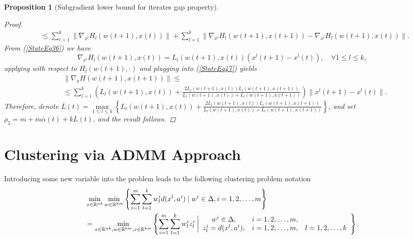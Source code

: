 \documentclass[11pt]{article}
\numberwithin{equation}{section}
\newtheorem{proposition}{Proposition}[section]
\begin{document}
\begin{proposition}[Subgradient lower bound for iterates gap property]
\begin{proof}
\begin{equation}
\begin{aligned}
	&\leq \sum\limits_{l=1}^{k} \| \nabla_{x^l} H_l(w(t+1),x(t)) \| + \sum\limits_{l=1}^{k} \| \nabla_{x^l} H_l(w(t+1),x(t+1)) - \nabla_{x^l} H_l(w(t+1),x(t))\| . \label{StateEq47}
\end{aligned}
\end{equation}
From (\ref{StateEq36}) we have
\begin{equation*}
\nabla_{x^l} H_l(w(t+1),x(t)) = L_l(w(t+1),x(t)) \left( x^l(t+1) - x^l(t) \right) , \quad \forall 1 \leq l \leq k,
\end{equation*}
applying  with respect to $H_l(w(t+1),\cdot)$ and plugging into (\ref{StateEq47}) yields
\begin{equation*}
\begin{aligned}
	&\| \nabla_x H(w(t+1),x(t+1)) \| \leq \\
	&\leq \sum\limits_{l=1}^{k} \left( L_l(w(t+1),x(t)) + \frac{2 L_l(w(t+1),x(t)) L_l(w(t+1),x(t+1))}{L_l(w(t+1),x(t)) + L_l(w(t+1),x(t+1))} \right) \|x^l(t+1) - x^l(t)\| .
\end{aligned}
\end{equation*}
Therefore, denote $\overline{L}(t) = \max\limits_{1 \leq l \leq k} \left\lbrace L_l(w(t+1),x(t)) + \frac{2 L_l(w(t+1),x(t)) L_l(w(t+1),x(t+1))}{L_l(w(t+1),x(t)) + L_l(w(t+1),x(t+1))} \right\rbrace$, and set \\ $\rho_2 = m + m\overline{\alpha}(t) + k\overline{L}(t)$, and the result follows.
\end{proof}

\end{proposition}

\newpage

\section{Clustering via ADMM Approach}
Introducing some new variable into the problem leads to the following clustering problem notation
\begin{equation*}
\begin{split}
	&\min\limits_{x \in \mathbb{R}^{nk}} \min\limits_{w \in \mathbb{R}^{km}} \left\lbrace \sum\limits_{i=1}^{m} \sum\limits_{l=1}^{k} w^i_l d(x^l,a^i) \mid w^i \in \Delta, i=1,2, \ldots, m \right\rbrace \\
	&= \min\limits_{x \in \mathbb{R}^{nk}, w \in \mathbb{R}^{km}, z \in \mathbb{R}^{km}} \left\lbrace \sum\limits_{i=1}^{m} \sum\limits_{l=1}^{k} w^i_l z^i_l \: \bigg| 
\begin{array}{c c c}
 w^i \in \Delta, & i=1,2, \ldots, m, & \\
 z^i_l = d(x^l,a^i), & i=1,2, \ldots, m, & l=1,2, \ldots, k
\end{array}
\right\rbrace .
\end{split}
\end{equation*}
\end{document}
